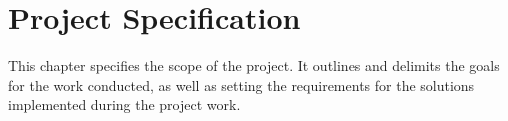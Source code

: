 \chapter{Project Specification}\label{ch:projecspec}\glsresetall
This chapter specifies the scope of the project. It outlines and delimits the goals for the work conducted, as well as setting the requirements for the solutions implemented during the project work. 
